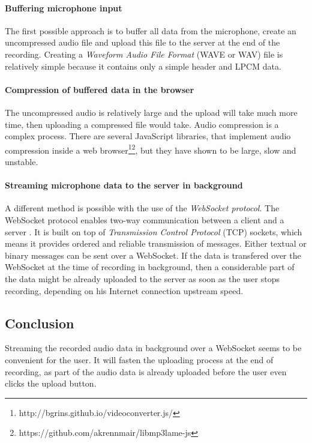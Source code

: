 \paragraph{Buffering microphone input} The first possible approach is to buffer all data from the microphone, create an uncompressed audio file and upload this file to the server at the end of the recording. Creating a \textit{Waveform Audio File Format} (WAVE or WAV) file is relatively simple because it contains only a simple header and LPCM data.

\paragraph{Compression of buffered data in the browser} The uncompressed audio is relatively large and the upload will take much more time, then uploading a compressed file would take. Audio compression is a complex process. There are several JavaScript libraries, that implement audio compression inside a web browser\footnote{http://bgrins.github.io/videoconverter.js/}\footnote{https://github.com/akrennmair/libmp3lame-js}, but they have shown to be large, slow and unstable.

\paragraph{Streaming microphone data to the server in background} A different method is possible with the use of the \textit{WebSocket protocol}. The WebSocket protocol enables two-way communication between a client and a server \cite{websocket}. It is built on top of \textit{Transmission Control Protocol} (TCP) sockets, which means it provides ordered and reliable transmission of messages. Either textual or binary messages can be sent over a WebSocket. If the data is transfered over the WebSocket at the time of recording in background, then a considerable part of the data might be already uploaded to the server as soon as the user stops recording, depending on his Internet connection upstream speed.

\subsection{Conclusion}
Streaming the recorded audio data in background over a WebSocket seems to be convenient for the user. It will fasten the uploading process at the end of recording, as part of the audio data is already uploaded before the user even clicks the upload button.

